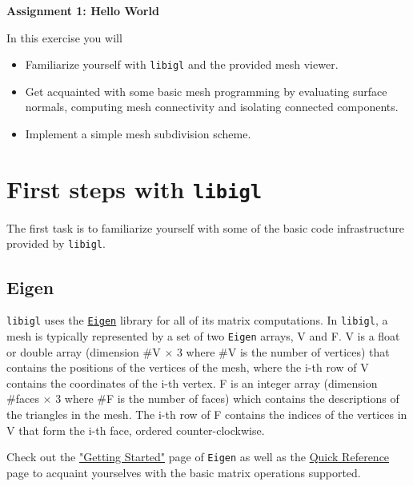 \documentclass[11pt]{amsart}
\begin{document}
\hspace{50pt}

\begin{center}

{\Huge \textbf{Assignment 1: Hello World}}\\
\vspace{10pt}
\end{center}

In this exercise you will
\begin{itemize}
\item{Familiarize yourself with \texttt{libigl} and the provided mesh viewer.}
\item{Get acquainted with some basic mesh programming by evaluating surface
    normals, computing mesh connectivity and isolating connected components.}
\item{Implement a simple mesh subdivision scheme.}
\end{itemize}

\section{First steps with \texttt{libigl}}
The first task is to familiarize yourself with some of the basic code
infrastructure provided by \texttt{libigl}. 

\subsection{Eigen}
\texttt{libigl} uses the \href{http://eigen.tuxfamily.org/}{\texttt{Eigen}}
library for all of its matrix computations. In \texttt{libigl}, a mesh is typically
represented by a set of two \texttt{Eigen} arrays, V and F. V is a float or
double array (dimension \#V $\times$ 3 where \#V is the number of vertices) that
contains the positions of the vertices of the mesh, where the i-th row of V
contains the coordinates of the i-th vertex. F is an integer array (dimension
\#faces $\times$ 3 where \#F is the number of faces) which contains the
descriptions of the triangles in the mesh. The i-th row of F contains the
indices of the vertices in V that form the i-th face, ordered counter-clockwise. 

Check out the
\href{http://eigen.tuxfamily.org/dox/GettingStarted.html}{"Getting Started"}
page of \texttt{Eigen} as well as the
\href{http://eigen.tuxfamily.org/dox/group__QuickRefPage.html}{Quick Reference}
page to acquaint yourselves with the basic matrix operations supported.
\end{document}
